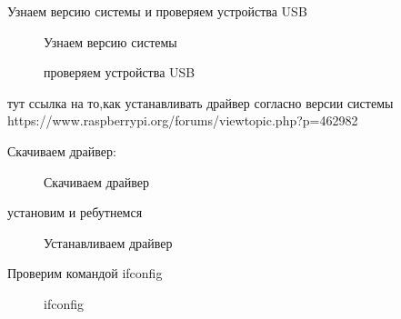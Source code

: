 

Узнаем версию системы и проверяем устройства USB

\begin{figure}[h!]
\caption{ Узнаем версию системы }
\label{driver_1:driver_1}
\end{figure}


\begin{figure}[h!]
\caption{ проверяем устройства USB }
\label{driver_2:driver_2}
\end{figure}


тут ссылка на то,как устанавливать драйвер согласно версии системы
https://www.raspberrypi.org/forums/viewtopic.php?p=462982

Скачиваем драйвер:

\begin{figure}[h!]
\caption{ Скачиваем драйвер }
\label{driver_3:driver_3}
\end{figure}

установим и ребутнемся

\begin{figure}[h!]
\caption{ Устанавливаем драйвер }
\label{driver_4:driver_4}
\end{figure}

Проверим командой ifconfig

\begin{figure}[h!]
\caption{ ifconfig }
\label{driver_5:driver_5}
\end{figure}






